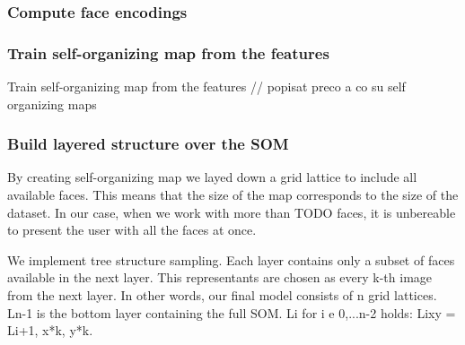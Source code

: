 \subsubsection*{Compute face encodings}


\subsubsection*{Train self-organizing map from the features}
Train self-organizing map from the features
// popisat preco a co su self organizing maps



\subsubsection*{Build layered structure over the SOM}

By creating self-organizing map we layed down a grid lattice to include all available faces. This means that the size of the map corresponds to the size of the dataset. In our case, when we work with more than TODO faces, it is unbereable to present the user with all the faces at once.

We implement tree structure sampling. Each layer contains only a subset of faces available in the next layer. This representants are chosen as every k-th image from the next layer. In other words, our final model consists of n grid lattices. Ln-1 is the bottom layer containing the full SOM. Li for i e {0,...n-2} holds: Lixy = Li+1, x*k, y*k.
